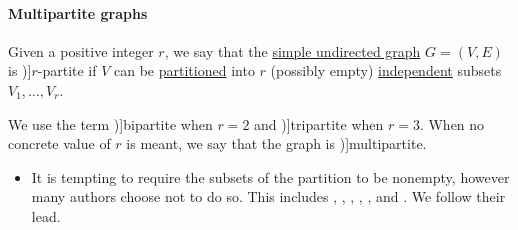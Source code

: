\paragraph{Multipartite graphs}

\begin{definition}\label{def:multipartite_graph}
  Given a positive integer \( r \), we say that the \hyperref[def:undirected_graph]{simple undirected graph} \( G = (V, E) \) is \term[ru=\( r \)-дольный (граф) (\cite[11]{Емеличев1990})]{\( r \)-partite} if \( V \) can be \hyperref[def:set_partition]{partitioned} into \( r \) (possibly empty) \hyperref[def:graph_independent_set]{independent} subsets \( V_1, \ldots, V_r \).

  We use the term \term[ru=двудольный (граф) (\cite[11]{Емеличев1990})]{bipartite} when \( r = 2 \) and \term[ru=трёхдольный (граф) (\cite[11]{Емеличев1990})]{tripartite} when \( r = 3 \). When no concrete value of \( r \) is meant, we say that the graph is \term[en=multipartite (graph) (\cite[ex. 8.5.5]{Knauer2011})]{multipartite}.
\end{definition}
\begin{itemize}
  \item It is tempting to require the subsets of the partition to be nonempty, however many authors choose not to do so. This includes , , , , ,  and . We follow their lead.
\end{itemize}

